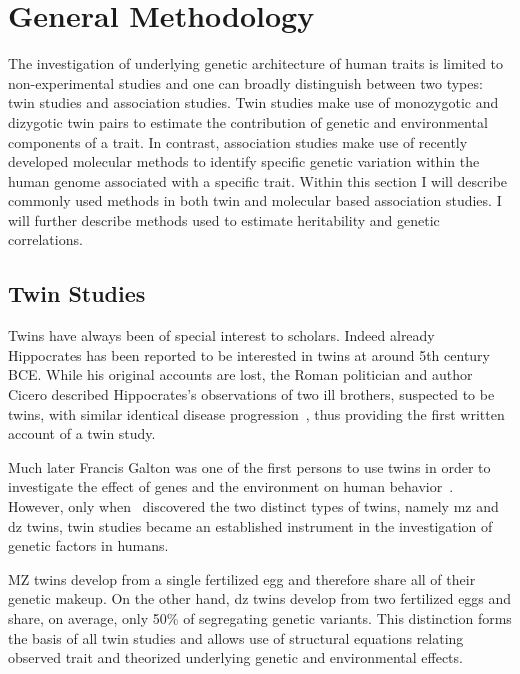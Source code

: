 \chapter{General Methodology}
\label{cha:methods_applied_in_genetic_studies_on_humans}

The investigation of underlying genetic architecture of human traits is limited to non-experimental studies and one can broadly distinguish between two types: twin studies and association studies.
Twin studies make use of monozygotic and dizygotic twin pairs to estimate the contribution of genetic and environmental components of a trait.
In contrast, association studies make use of recently developed molecular methods to identify specific genetic variation within the human genome associated with a specific trait.
Within this section I will describe commonly used methods in both twin and molecular based association studies.
I will further describe methods used to estimate heritability and genetic correlations.

\section{Twin Studies}
\label{sec:twin_based_studies}

Twins have always been of special interest to scholars.
Indeed already Hippocrates has been reported to be interested in twins at around 5th century BCE\@.
While his original accounts are lost, the Roman politician and author Cicero described Hippocrates's observations of two ill brothers, suspected to be twins, with similar identical disease progression~\cite{Cicero44BC},
thus providing the first written account of a twin study.

Much later Francis Galton was one of the first persons to use twins in order to investigate the effect of genes and the environment on human behavior~\cite{Rende1990}.
However, only when~\citet{Simens1924} discovered the two distinct types of twins, namely \acrfull{mz} and \acrfull{dz} twins, twin studies became an established instrument in the investigation of genetic factors in humans.

MZ twins develop from a single fertilized egg and therefore share all of their genetic makeup.
On the other hand, \acrshort{dz} twins develop from two fertilized eggs and share, on average, only 50\% of segregating genetic variants.
This distinction forms the basis of all twin studies and allows use of structural equations relating observed trait and theorized underlying genetic and environmental effects.

